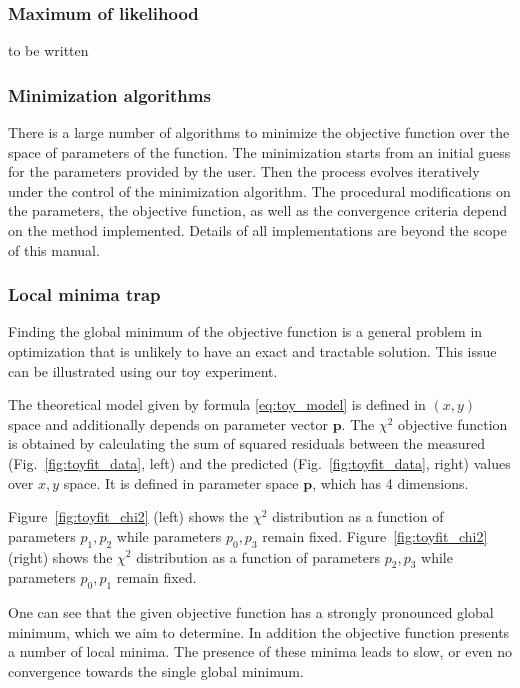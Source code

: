 \subsubsection*{Maximum of likelihood}
to be written


\subsubsection*{Minimization algorithms}
There is a large number of algorithms to minimize the objective function over the space of parameters of the function.
The minimization starts from an initial guess for the parameters
provided by the user. Then the process evolves iteratively under the
control of the minimization algorithm. The procedural
modifications on the parameters, the objective function, as well as
the convergence
criteria depend on the method implemented.
Details of all implementations are beyond the scope of this manual.



\subsubsection*{Local minima trap}
Finding the global minimum of the objective function 
is a general problem in optimization that is unlikely to have an exact and 
tractable solution. This issue can be illustrated using our toy experiment.

The theoretical model given by formula \ref{eq:toy_model} is defined
in $(x,y)$ space and additionally depends on parameter vector $\mathbf{p}$. 
The $\chi^2$ 
objective function is obtained by calculating the sum of squared residuals between
the measured (Fig.~\ref{fig:toyfit_data}, left) and the 
predicted (Fig.~\ref{fig:toyfit_data}, right) values over $x,y$ space. It is defined
in parameter space $\mathbf{p}$, which has 4 dimensions.

Figure~\ref{fig:toyfit_chi2} (left) shows the $\chi^2$ distribution as a function of
parameters $p_1,p_2$  while parameters $p_0,p_3$ remain fixed.
Figure~\ref{fig:toyfit_chi2} (right) shows the $\chi^2$ distribution as a function of
parameters $p_2,p_3$ while parameters $p_0,p_1$ remain fixed.

One can see that the given objective function has a strongly
pronounced global minimum, which we aim to determine. In addition the
objective function presents a number of local minima.
The presence of these minima leads to slow, or even no convergence
towards the  single global minimum.


